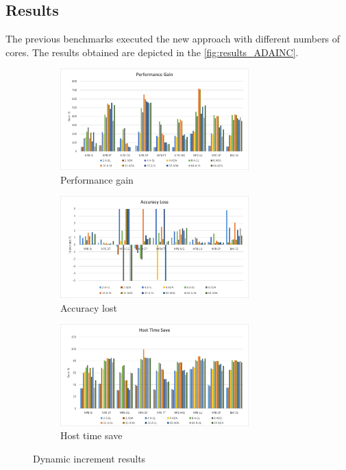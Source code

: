 \subsection{Results}

The previous benchmarks executed the new approach with different numbers of cores. The results obtained are depicted in the 
\autoref{fig:results_ADAINC}. 

\begin{figure}[H]
\centering
\begin{subfigure}{\textwidth}
    \centering
    \includegraphics[width=0.8\textwidth]{Images/Performance_ADA_INC.png}
    \caption{ Performance gain}
    \label{fig:Performance_ADAINC}
\end{subfigure}
\begin{subfigure}{\textwidth}
    \centering
    \includegraphics[width=0.8\textwidth]{Images/Accuracy_ADA_INC.png}
    \caption{ Accuracy lost}
    \label{fig:Accuracy_ADAINC}
\end{subfigure}
\begin{subfigure}{\textwidth}
    \centering
    \includegraphics[width=0.8\textwidth]{Images/Host_ADA_INC.png}
    \caption{ Host time save}
    \label{fig:Host_ADAINC}
\end{subfigure}
        
\caption{Dynamic increment results}
\label{fig:results_ADAINC}
\end{figure}

